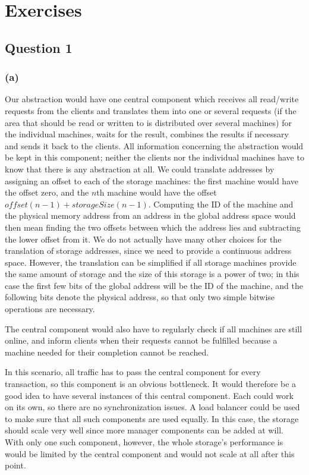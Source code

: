 \documentclass[12pt,a4paper]{article}
\begin{document}
\section*{Exercises} 
\label{sec:exercises}

\subsection*{Question 1}
\label{sec:eq1}
\subsubsection*{(a)}
Our abstraction would have one central component which receives all read/write requests from the clients and translates them into one or several requests (if the area that should be read or written to is distributed over several machines) for the individual machines, waits for the result, combines the results if necessary and sends it back to the clients. All information concerning the abstraction would be kept in this component; neither the clients nor the individual machines have to know that there is any abstraction at all. We could translate addresses by assigning an offset to each of the storage machines: the first machine would have the offset zero, and the $n$th machine would have the offset $offset(n-1) + storageSize(n-1)$. Computing the ID of the machine and the physical memory address from an address in the global address space would then mean finding the two offsets between which the address lies and subtracting the lower offset from it.
We do not actually have many other choices for the translation of storage addresses, since we need to provide a continuous address space.
However, the translation can be simplified if all storage machines provide the same amount of storage and the size of this storage is a power of two; in this case the first few bits of the global address will be the ID of the machine, and the following bits denote the physical address, so that only two simple bitwise operations are necessary.

The central component would also have to regularly check if all machines are still online, and inform clients when their requests cannot be fulfilled because a machine needed for their completion cannot be reached. 

In this scenario, all traffic has to pass the central component for every transaction, so this component is an obvious bottleneck. It would therefore be a good idea to have several instances of this central component. Each could work on its own, so there are no synchronization issues. A load balancer could be used to make sure that all such components are used equally. In this case, the storage should scale very well since more manager components can be added at will. With only one such component, however, the whole storage's performance is would be limited by the central component and would not scale at all after this point.
\end{document}
